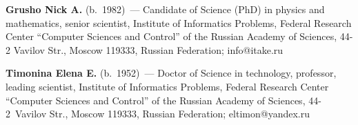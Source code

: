 \vspace*{3pt}

\noindent
\textbf{Grusho Nick A.} (b.\ 1982)~--- Candidate of Science (PhD) in physics and mathematics, 
senior scientist, Institute of Informatics Problems, Federal Research Center ``Computer 
Sciences and Control'' of the Russian Academy of Sciences,
44-2 Vavilov 
    Str., Moscow 119333, Russian Federation; info@itake.ru

\vspace*{3pt}

\noindent
\textbf{Timonina Elena E.} (b.\ 1952)~--- Doctor of Science in technology, professor, leading 
scientist, Institute of Informatics Problems, Federal Research Center ``Computer Sciences and 
Control'' of the Russian Academy of Sciences,
44-2~Vavilov Str., Moscow 119333, Russian Federation; eltimon@yandex.ru
    

\label{end\stat}


\renewcommand{\bibname}{\protect\rm Литература}